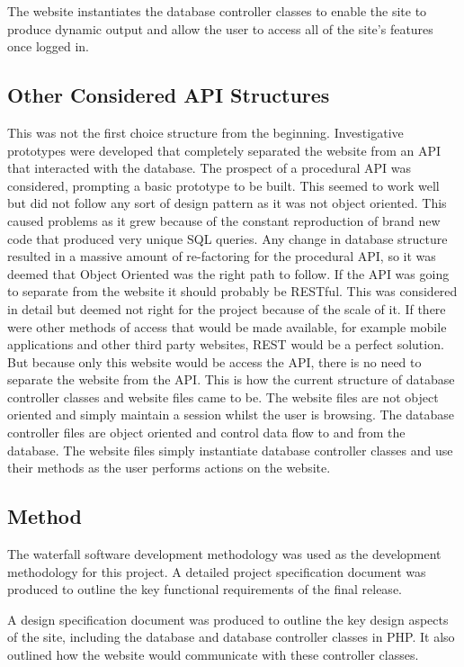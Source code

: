 		The website instantiates the database controller classes to enable the site to produce dynamic output and allow the user to access all of the site's features once logged in.
		
	\subsection{Other Considered API Structures}
		This was not the first choice structure from the beginning. Investigative prototypes were developed that completely separated the website from an API that interacted with the database. The prospect of a procedural API was considered, prompting a basic prototype to be built. This seemed to work well but did not follow any sort of design pattern as it was not object oriented. This caused problems as it grew because of the constant reproduction of brand new code that produced very unique SQL queries. Any change in database structure resulted in a massive amount of re-factoring for the procedural API, so it was deemed that Object Oriented was the right path to follow. If the API was going to separate from the website it should probably be RESTful. This was considered in detail but deemed not right for the project because of the scale of it. If there were other methods of access that would be made available, for example mobile applications and other third party websites, REST would be a perfect solution. But because only this website would be access the API, there is no need to separate the website from the API. This is how the current structure of database controller classes and website files came to be. The website files are not object oriented and simply maintain a session whilst the user is browsing. The database controller files are object oriented and control data flow to and from the database. The website files simply instantiate database controller classes and use their methods as the user performs actions on the website.
		
	\subsection{Method}
		The waterfall software development methodology was used as the development methodology for this project. A detailed project specification document was produced to outline the key functional requirements of the final release. 
		
		A design specification document was produced to outline the key design aspects of the site, including the database and database controller classes in PHP. It also outlined how the website would communicate with these controller classes.
		

